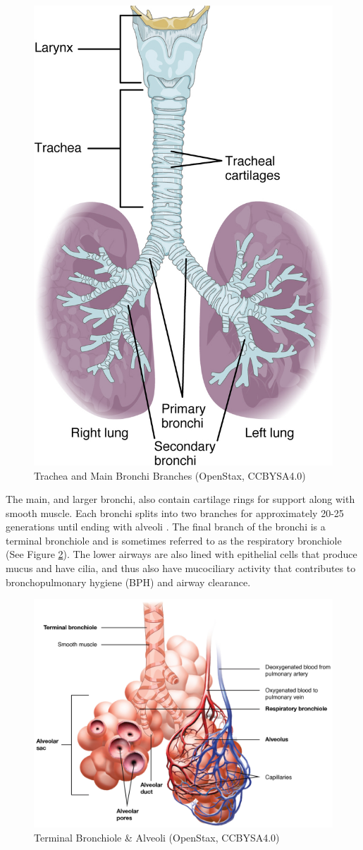 \begin{figure}[!h]
    \centering
    \includegraphics[width=0.4 \linewidth]{./figure/ventilation/lower_airways.jpg}
    \caption{Trachea and Main Bronchi Branches \footnotesize{(OpenStax, CCBYSA4.0)}}
    \label{fig:lower_airways}
\end{figure}

The main, and larger bronchi, also contain cartilage rings for support along with smooth muscle. Each bronchi splits into two branches for approximately 20-25 generations until ending with alveoli \cite{hall_guyton_2020}. The final branch of the bronchi is a terminal bronchiole and is sometimes referred to as the respiratory bronchiole (See Figure \ref{fig:alveoli}). The lower airways are also lined with epithelial cells that produce mucus and have cilia, and thus also have mucociliary activity that contributes to bronchopulmonary hygiene (BPH) and airway clearance. 

\begin{figure}[!h]
    \centering
    \includegraphics[width=0.5 \linewidth]{./figure/ventilation/alveoli.jpg}
    \caption{Terminal Bronchiole \& Alveoli \footnotesize{(OpenStax, CCBYSA4.0)}}
    \label{fig:alveoli}
\end{figure}


